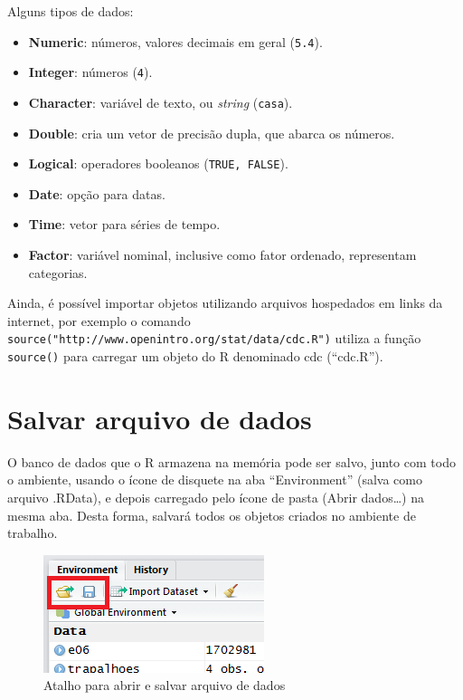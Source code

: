 \documentclass[12pt,brazil,oneside]{book}
\providecommand{\tightlist}{%
  \setlength{\itemsep}{0pt}\setlength{\parskip}{0pt}}
\begin{document}
Alguns tipos de dados:

\begin{itemize}
\tightlist
\item
  \textbf{Numeric}: números, valores decimais em geral (\texttt{5.4}).
\item
  \textbf{Integer}: números (\texttt{4}).
\item
  \textbf{Character}: variável de texto, ou \emph{string} (\texttt{casa}).
\item
  \textbf{Double}: cria um vetor de precisão dupla, que abarca os números.
\item
  \textbf{Logical}: operadores booleanos (\texttt{TRUE,\ FALSE}).
\item
  \textbf{Date}: opção para datas.
\item
  \textbf{Time}: vetor para séries de tempo.
\item
  \textbf{Factor}: variável nominal, inclusive como fator ordenado, representam categorias.
\end{itemize}

Ainda, é possível importar objetos utilizando arquivos hospedados em links da internet, por exemplo o comando \texttt{source("http://www.openintro.org/stat/data/cdc.R")} utiliza a função \texttt{source()} para carregar um objeto do R denominado cdc (``cdc.R'').

\hypertarget{salvar-arquivo-de-dados}{%
\section{Salvar arquivo de dados}\label{salvar-arquivo-de-dados}}

O banco de dados que o R armazena na memória pode ser salvo, junto com todo o ambiente, usando o ícone de disquete na aba ``Environment'' (salva como arquivo .RData), e depois carregado pelo ícone de pasta (Abrir dados\ldots{}) na mesma aba. Desta forma, salvará todos os objetos criados no ambiente de trabalho.

\begin{figure}[H]

{\centering \includegraphics[width=0.7\linewidth]{r6} 

}

\caption{Atalho para abrir e salvar arquivo de dados}\label{fig:r6}
\end{figure}
\end{document}
